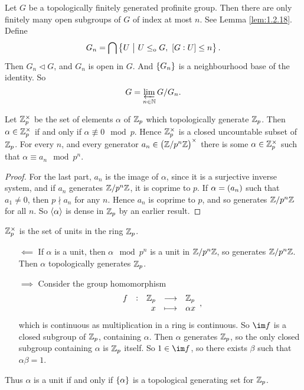 \begin{example}
\label{eg:2.5.9}
Let $ G $ be a topologically finitely generated profinite group. Then there are only finitely many open subgroups of $ G $ of index at most $ n $. See Lemma \ref{lem:1.2.18}. Define
$$ G_n = \bigcap \cbr{U \st U \le_\o G, \ \sbr{G : U} \le n}. $$
Then $ G_n \triangleleft G $, and $ G_n $ is open in $ G $. And $ \cbr{G_n} $ is a neighbourhood base of the identity. So
$$ G = \varprojlim_{n \in \mathbb{N}} G / G_n. $$
\end{example}

\begin{proposition}
\label{prop:2.5.10}
Let $ \mathbb{Z}_p^\times $ be the set of elements $ \alpha $ of $ \mathbb{Z}_p $ which topologically generate $ \mathbb{Z}_p $. Then $ \alpha \in \mathbb{Z}_p^\times $ if and only if $ \alpha \not\equiv 0 \mod p $. Hence $ \mathbb{Z}_p^\times $ is a closed uncountable subset of $ \mathbb{Z}_p $. For every $ n $, and every generator $ a_n \in \br{\ZZ / p^n\ZZ}^\times $ there is some $ \alpha \in \mathbb{Z}_p^\times $ such that $ \alpha \equiv a_n \mod p^n $.
\end{proposition}

\begin{proof}
For the last part, $ a_n $ is the image of $ \alpha $, since it is a surjective inverse system, and if $ a_n $ generates $ \mathbb{Z} / p^n\mathbb{Z} $, it is coprime to $ p $. If $ \alpha = \br{a_n} $ such that $ a_1 \ne 0 $, then $ p \nmid a_n $ for any $ n $. Hence $ a_n $ is coprime to $ p $, and so generates $ \mathbb{Z} / p^n\mathbb{Z} $ for all $ n $. So $ \left\langle \alpha \right\rangle $ is dense in $ \mathbb{Z}_p $ by an earlier result.
\end{proof}


\begin{remark}
$ \mathbb{Z}_p^\times $ is the set of units in the ring $ \mathbb{Z}_p $.
\begin{itemize}[leftmargin=0.5in]
\item[$ \impliedby $] If $ \alpha $ is a unit, then $ \alpha \mod p^n $ is a unit in $ \mathbb{Z} / p^n\mathbb{Z} $, so generates $ \mathbb{Z} / p^n\mathbb{Z} $. Then $ \alpha $ topologically generates $ \mathbb{Z}_p $.

\pagebreak

\item[$ \implies $] Consider the group homomorphism
$$ \function[f]{\ZZ_p}{\ZZ_p}{x}{\alpha x}, $$
which is continuous as multiplication in a ring is continuous. So $ \im f $ is a closed subgroup of $ \mathbb{Z}_p $, containing $ \alpha $. Then $ \alpha $ generates $ \mathbb{Z}_p $, so the only closed subgroup containing $ \alpha $ is $ \mathbb{Z}_p $ itself. So $ 1 \in \im f $, so there exists $ \beta $ such that $ \alpha\beta = 1 $.
\end{itemize}
Thus $ \alpha $ is a unit if and only if $ \cbr{\alpha} $ is a topological generating set for $ \mathbb{Z}_p $.
\end{remark}

